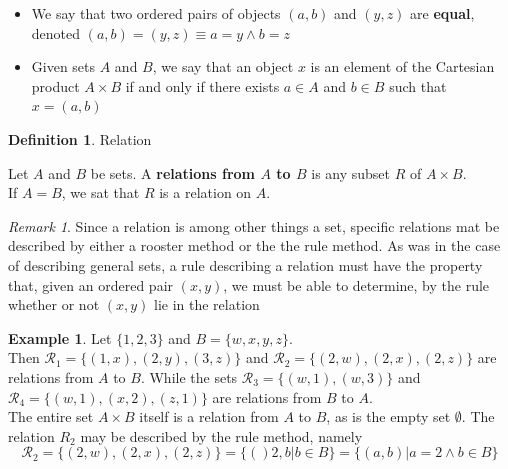 \documentclass{book}
\theoremstyle{definition}
\newtheorem{definition}{Definition}[section]
\newtheorem{example}{Example}[definition]
\theoremstyle{remark}
\newtheorem{remark}{Remark}
\newcommand{\cc}[1]{\mathcal{#1}}
\begin{document}
        \begin{itemize}
            \item We say that two ordered pairs of objects $(a,b)$ and $(y,z)$ are \textbf{equal}, denoted
            $(a,b)=(y,z) \equiv a=y \wedge b=z$
            \item Given sets $A$ and $B$, we say that an object $x$ is an element of the Cartesian product $A \times B$ if and only if there exists $a \in A$ and $b \in B$ such that $x = (a,b)$
        \end{itemize}
    
    
    \begin{definition}
    Relation \\   
        \begin{tcolorbox}
            Let $A$ and $B$ be sets. A \textbf{relations from $A$ to $B$} is any subset $R$ of $A \times B$. \\
            If $A = B$, we sat that $R$ is a relation on $A$.
        \end{tcolorbox}
    \end{definition}
    
    \begin{remark}
        Since a relation is among other things a set, specific relations mat be described by either a rooster method or the the rule method. As was in the case of describing general sets, a rule describing a relation must have the property that, given an ordered pair $(x,y)$, we must be able to determine, by the rule whether or not $(x,y)$ lie in the relation
    \end{remark}
    
    \begin{example}
    Let $\{ 1,2,3 \}$ and $B = \{w,x,y,z \}$. \\
    
    Then $\cc{R}_1 = \{ (1,x), (2,y), (3,z) \}$ and $\cc{R}_2 = \{ (2,w), (2,x), (2,z) \}$ are relations from $A$ to $B$. While the sets $\cc{R}_3 = \{ (w,1), (w,3) \}$ and $\cc{R}_4 = \{ (w,1), (x,2), (z,1) \}$ are relations from $B$ to $A$. \\
    
    The entire set $A \times B$ itself is a relation from $A$ to $B$, as is the empty set $\emptyset$. The relation $R_2$ may be described by the rule method, namely
        \begin{equation*}
            \cc{R}_2 = \{ (2,w), (2,x), (2,z) \} = \{ ()2,b | b \in B \} = \{ (a,b) | a=2 \wedge b \in B \}
        \end{equation*}
    \end{example}
    
\end{document}

